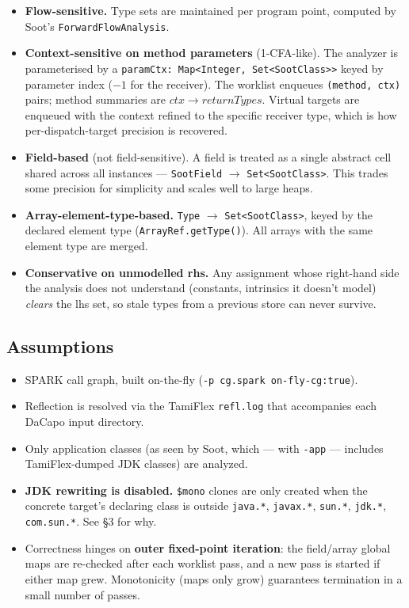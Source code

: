 \documentclass[11pt,a4paper]{article}
\begin{document}
\begin{itemize}[topsep=2pt,itemsep=0pt]
  \item \textbf{Flow-sensitive.} Type sets are maintained per program
    point, computed by Soot's \texttt{ForwardFlowAnalysis}.
  \item \textbf{Context-sensitive on method parameters} (1-CFA-like). The
    analyzer is parameterised by a \texttt{paramCtx: Map<Integer,
    Set<SootClass>>} keyed by parameter index ($-1$ for the receiver).
    The worklist enqueues \texttt{(method, ctx)} pairs; method summaries
    are $\mathit{ctx} \to \mathit{returnTypes}$. Virtual targets are
    enqueued with the context refined to the specific receiver type,
    which is how per-dispatch-target precision is recovered.
  \item \textbf{Field-based} (not field-sensitive). A field is treated as
    a single abstract cell shared across all instances ---
    \texttt{SootField} $\to$ \texttt{Set<SootClass>}. This trades some
    precision for simplicity and scales well to large heaps.
  \item \textbf{Array-element-type-based.}
    \texttt{Type} $\to$ \texttt{Set<SootClass>}, keyed by the declared
    element type (\texttt{ArrayRef.getType()}). All arrays with the same
    element type are merged.
  \item \textbf{Conservative on unmodelled rhs.} Any assignment whose
    right-hand side the analysis does not understand (constants,
    intrinsics it doesn't model) \emph{clears} the lhs set, so stale
    types from a previous store can never survive.
\end{itemize}

\subsection*{Assumptions}

\begin{itemize}[topsep=2pt,itemsep=0pt]
  \item SPARK call graph, built on-the-fly
    (\texttt{-p cg.spark on-fly-cg:true}).
  \item Reflection is resolved via the TamiFlex \texttt{refl.log} that
    accompanies each DaCapo input directory.
  \item Only application classes (as seen by Soot, which --- with
    \texttt{-app} --- includes TamiFlex-dumped JDK classes) are analyzed.
  \item \textbf{JDK rewriting is disabled.} \texttt{\$mono} clones are
    only created when the concrete target's declaring class is outside
    \texttt{java.*}, \texttt{javax.*}, \texttt{sun.*}, \texttt{jdk.*},
    \texttt{com.sun.*}. See \S3 for why.
  \item Correctness hinges on \textbf{outer fixed-point iteration}: the
    field/array global maps are re-checked after each worklist pass, and
    a new pass is started if either map grew. Monotonicity (maps only
    grow) guarantees termination in a small number of passes.
\end{itemize}
\end{document}
